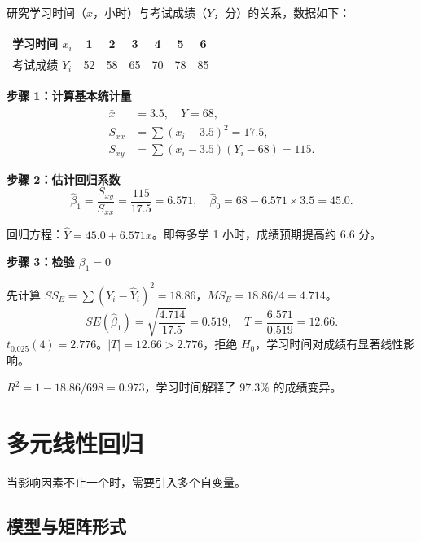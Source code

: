 \begin{example}[一元线性回归完整演示]
研究学习时间（$x$，小时）与考试成绩（$Y$，分）的关系，数据如下：

\begin{center}
\begin{tabular}{c|cccccc}
    \toprule
    学习时间 $x_i$ & 1 & 2 & 3 & 4 & 5 & 6 \\
    \midrule
    考试成绩 $Y_i$ & 52 & 58 & 65 & 70 & 78 & 85 \\
    \bottomrule
\end{tabular}
\end{center}

\textbf{步骤 1：计算基本统计量}
\begin{align}
    \bar{x} &= 3.5, \quad \bar{Y} = 68, \\
    S_{xx} &= \sum (x_i - 3.5)^2 = 17.5, \\
    S_{xy} &= \sum (x_i - 3.5)(Y_i - 68) = 115.
\end{align}

\textbf{步骤 2：估计回归系数}
\begin{equation}
    \hat{\beta}_1 = \frac{S_{xy}}{S_{xx}} = \frac{115}{17.5} = 6.571,
    \quad
    \hat{\beta}_0 = 68 - 6.571 \times 3.5 = 45.0.
\end{equation}

回归方程：$\hat{Y} = 45.0 + 6.571 x$。即每多学 1 小时，成绩预期提高约 6.6 分。

\textbf{步骤 3：检验 $\beta_1 = 0$}

先计算 $SS_E = \sum (Y_i - \hat{Y}_i)^2 = 18.86$，$MS_E = 18.86/4 = 4.714$。
\begin{equation}
    SE(\hat{\beta}_1) = \sqrt{\frac{4.714}{17.5}} = 0.519,
    \quad
    T = \frac{6.571}{0.519} = 12.66.
\end{equation}
$t_{0.025}(4) = 2.776$。$|T| = 12.66 > 2.776$，拒绝 $H_0$，学习时间对成绩有显著线性影响。

$R^2 = 1 - 18.86/698 = 0.973$，学习时间解释了 97.3\% 的成绩变异。
\end{example}

\section{多元线性回归}

当影响因素不止一个时，需要引入多个自变量。

\subsection{模型与矩阵形式}


